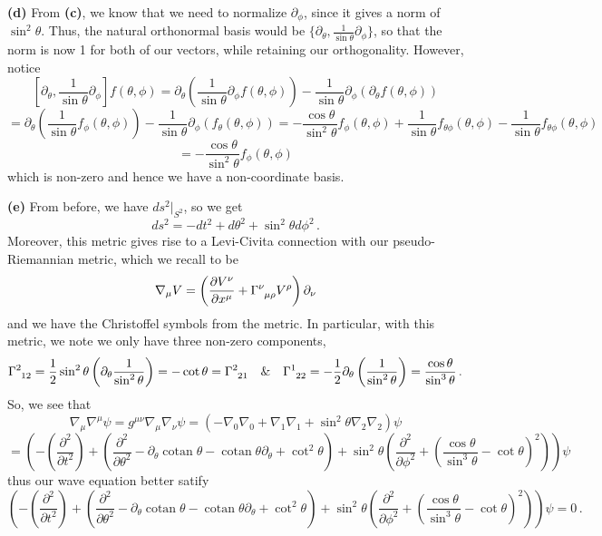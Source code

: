 \documentclass[10pt]{article}
\DeclareMathOperator{\cotan}{cotan}
\begin{document}
\textbf{(d)} From \textbf{(c)}, we know that we need to normalize $\partial_{\phi}$, since it gives a norm of $\sin^{2}\theta$. Thus, the natural orthonormal basis would be $\{\partial_{\theta},\frac{1}{\sin\theta}\partial_{\phi}\}$, so that the norm is now 1 for both of our vectors, while retaining our orthogonality. However, notice
\[ [\partial_{\theta},\frac{1}{\sin\theta}\partial_{\phi}]f(\theta,\phi) = \partial_{\theta}\left(\frac{1}{\sin\theta}\partial_{\phi}f(\theta,\phi)\right) - \frac{1}{\sin\theta}\partial_{\phi}\left(\partial_{\theta}f(\theta,\phi)\right)\]
\[ = \partial_{\theta}\left(\frac{1}{\sin\theta}f_{\phi}(\theta,\phi)\right)- \frac{1}{\sin\theta}\partial_{\phi}\left(f_{\theta}(\theta,\phi)\right) = -\frac{\cos\theta}{\sin^{2}\theta}f_{\phi}(\theta,\phi) + \frac{1}{\sin\theta}f_{\theta\phi}(\theta,\phi) - \frac{1}{\sin\theta}f_{\theta\phi}(\theta,\phi)\]
\[ = -\frac{\cos\theta}{\sin^{2}\theta}f_{\phi}(\theta,\phi)\]
which is non-zero and hence we have a non-coordinate basis.

\textbf{(e)} From before, we have $ds^{2}|_{S^{2}}$, so we get
\[ ds^{2} = -dt^{2} + d\theta^{2} + \sin^{2}\theta d\phi^{2} \, .\]
Moreover, this metric gives rise to a Levi-Civita connection with our pseudo-Riemannian metric, which we recall to be
\[ \nabla_{\mu}V = \left(\frac{\partial V^{\nu}}{\partial x^{\mu}} + \tensor{\Gamma}{^{\nu}_{\mu\rho}}V^{\rho}\right)\partial_{\nu} \]
and we have the Christoffel symbols from the metric. In particular, with this metric, we note we only have three non-zero components,
\[ \tensor{\Gamma}{^{2}_{12}} = \frac{1}{2}\sin^{2}\theta\left(\partial_{\theta}\frac{1}{\sin^{2}\theta}\right) = -\cot\theta = \tensor{\Gamma}{^{2}_{21}} \quad \& \quad \tensor{\Gamma}{^{1}_{22}} = -\frac{1}{2}\partial_{\theta}\left(\frac{1}{\sin^{2}\theta}\right) = \frac{\cos\theta}{\sin^{3}\theta}\, .\]
So, we see that
\[ \nabla_{\mu}\nabla^{\mu}\psi = g^{\mu\nu}\nabla_{\mu}\nabla_{\nu}\psi = \left(-\nabla_{0}\nabla_{0} + \nabla_{1}\nabla_{1} + \sin^{2}\theta\nabla_{2}\nabla_{2}\right)\psi \]
\[ = \left(-\left(\frac{\partial^{2}}{\partial t^{2}}\right) + \left(\frac{\partial^{2}}{\partial \theta^{2}} - \partial_{\theta}\cotan\theta - \cotan\theta\partial_{\theta} + \cot^{2}\theta\right) + \sin^{2}\theta\left(\frac{\partial^{2}}{\partial \phi^{2}} + \left(\frac{\cos\theta}{\sin^{3}\theta} - \cot\theta\right)^{2}\right)\right)\psi \]
thus our wave equation better satify
\[ \left(-\left(\frac{\partial^{2}}{\partial t^{2}}\right) + \left(\frac{\partial^{2}}{\partial \theta^{2}} - \partial_{\theta}\cotan\theta - \cotan\theta\partial_{\theta} + \cot^{2}\theta\right) + \sin^{2}\theta\left(\frac{\partial^{2}}{\partial \phi^{2}} + \left(\frac{\cos\theta}{\sin^{3}\theta} - \cot\theta\right)^{2}\right)\right)\psi = 0\, .\]
\end{document}
